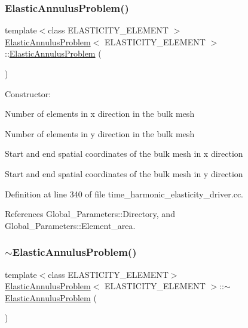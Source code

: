 \subsubsection{\texorpdfstring{Elastic\+Annulus\+Problem()}{ElasticAnnulusProblem()}\hspace{0.1cm}{\footnotesize\ttfamily [1/2]}}
{\footnotesize\ttfamily template$<$class E\+L\+A\+S\+T\+I\+C\+I\+T\+Y\+\_\+\+E\+L\+E\+M\+E\+NT $>$ \\
\hyperlink{classElasticAnnulusProblem}{Elastic\+Annulus\+Problem}$<$ E\+L\+A\+S\+T\+I\+C\+I\+T\+Y\+\_\+\+E\+L\+E\+M\+E\+NT $>$\+::\hyperlink{classElasticAnnulusProblem}{Elastic\+Annulus\+Problem} (\begin{DoxyParamCaption}{ }\end{DoxyParamCaption})}



Constructor\+: 

Number of elements in x direction in the bulk mesh

Number of elements in y direction in the bulk mesh

Start and end spatial coordinates of the bulk mesh in x direction

Start and end spatial coordinates of the bulk mesh in y direction 

Definition at line 340 of file time\+\_\+harmonic\+\_\+elasticity\+\_\+driver.\+cc.



References Global\+\_\+\+Parameters\+::\+Directory, and Global\+\_\+\+Parameters\+::\+Element\+\_\+area.

\mbox{\label{classElasticAnnulusProblem_a7e791acd99dc0ae25ab9f2e2fd07c587}} 
\subsubsection{\texorpdfstring{$\sim$\+Elastic\+Annulus\+Problem()}{~ElasticAnnulusProblem()}\hspace{0.1cm}{\footnotesize\ttfamily [1/2]}}
{\footnotesize\ttfamily template$<$class E\+L\+A\+S\+T\+I\+C\+I\+T\+Y\+\_\+\+E\+L\+E\+M\+E\+NT$>$ \\
\hyperlink{classElasticAnnulusProblem}{Elastic\+Annulus\+Problem}$<$ E\+L\+A\+S\+T\+I\+C\+I\+T\+Y\+\_\+\+E\+L\+E\+M\+E\+NT $>$\+::$\sim$\hyperlink{classElasticAnnulusProblem}{Elastic\+Annulus\+Problem} (\begin{DoxyParamCaption}{ }\end{DoxyParamCaption})\hspace{0.3cm}{\ttfamily [inline]}}




